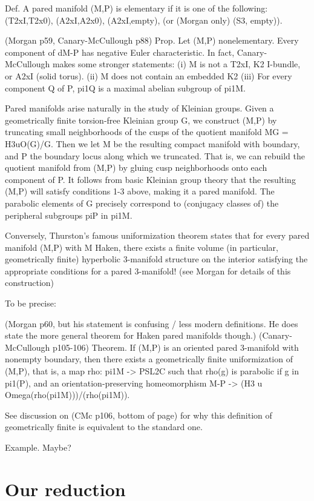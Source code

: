 \documentclass[12pt]{amsart}
\theoremstyle{definition}
\begin{document}
Def. A pared manifold (M,P) is elementary if it is one of the following:
(T2xI,T2x0), (A2xI,A2x0), (A2xI,empty), (or (Morgan only) (S3, empty)).

(Morgan p59, Canary-McCullough p88)
Prop. Let (M,P) nonelementary. Every component of dM-P has negative Euler
characteristic. In fact, Canary-McCullough makes some stronger statements:
(i) M is not a T2xI, K2 I-bundle, or A2xI (solid torus).
(ii) M does not contain an embedded K2
(iii) For every component Q of P, pi1Q is a maximal abelian subgroup of pi1M.

Pared manifolds arise naturally in the study of Kleinian groups. Given
a geometrically finite torsion-free Kleinian group G, we construct (M,P) by
truncating small neighborhoods of the cusps of the quotient manifold MG
= H3uO(G)/G.  Then we let M be the resulting compact manifold with boundary,
and P the boundary locus along which we truncated. That is, we can rebuild the
quotient manifold from (M,P) by gluing cusp neighborhoods onto each component
of P. It follows from basic Kleinian group theory that the resulting (M,P) will
satisfy conditions 1-3 above, making it a pared manifold. The parabolic
elements of G precisely correspond to (conjugacy classes of) the peripheral
subgroups piP in pi1M.

Conversely, Thurston's famous uniformization theorem states that for every
pared manifold (M,P) with M Haken, there exists a finite volume (in particular,
geometrically finite) hyperbolic 3-manifold structure on the interior
satisfying the appropriate conditions for a pared 3-manifold! (see Morgan for
details of this construction)

To be precise:

(Morgan p60, but his statement is confusing / less modern definitions. He does
state the more general theorem for Haken pared manifolds though.)
(Canary-McCullough p105-106)
Theorem. If (M,P) is an oriented pared 3-manifold with nonempty boundary, then
there exists a geometrically finite uniformization of (M,P), that is, a map
rho: pi1M -> PSL2C such that rho(g) is parabolic if g in pi1(P), and an
orientation-preserving homeomorphism M-P -> (H3
u Omega(rho(pi1M)))/(rho(pi1M)).

See discussion on (CMc p106, bottom of page) for why this definition of
geometrically finite is equivalent to the standard one.

Example. Maybe?

\section{Our reduction}
\end{document}
